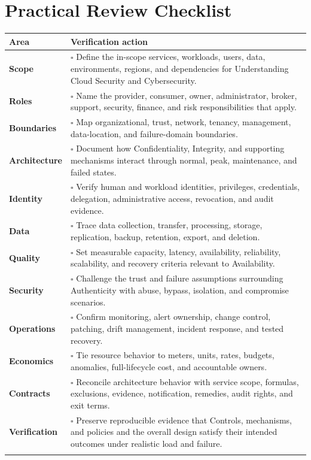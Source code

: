 \documentclass[11pt]{article}
\begin{document}
\section{Practical Review Checklist}
\begin{longtable}{@{}>{\bfseries\color{Teal}}p{}>{\RaggedRight\arraybackslash}p{}@{}}
\toprule\textbf{Area} & \textbf{Verification action}\\\midrule\endhead
Scope & $\square$ Define the in-scope services, workloads, users, data, environments, regions, and dependencies for Understanding Cloud Security and Cybersecurity. \\\addlinespace[2pt]
Roles & $\square$ Name the provider, consumer, owner, administrator, broker, support, security, finance, and risk responsibilities that apply. \\\addlinespace[2pt]
Boundaries & $\square$ Map organizational, trust, network, tenancy, management, data-location, and failure-domain boundaries. \\\addlinespace[2pt]
Architecture & $\square$ Document how Confidentiality, Integrity, and supporting mechanisms interact through normal, peak, maintenance, and failed states. \\\addlinespace[2pt]
Identity & $\square$ Verify human and workload identities, privileges, credentials, delegation, administrative access, revocation, and audit evidence. \\\addlinespace[2pt]
Data & $\square$ Trace data collection, transfer, processing, storage, replication, backup, retention, export, and deletion. \\\addlinespace[2pt]
Quality & $\square$ Set measurable capacity, latency, availability, reliability, scalability, and recovery criteria relevant to Availability. \\\addlinespace[2pt]
Security & $\square$ Challenge the trust and failure assumptions surrounding Authenticity with abuse, bypass, isolation, and compromise scenarios. \\\addlinespace[2pt]
Operations & $\square$ Confirm monitoring, alert ownership, change control, patching, drift management, incident response, and tested recovery. \\\addlinespace[2pt]
Economics & $\square$ Tie resource behavior to meters, units, rates, budgets, anomalies, full-lifecycle cost, and accountable owners. \\\addlinespace[2pt]
Contracts & $\square$ Reconcile architecture behavior with service scope, formulas, exclusions, evidence, notification, remedies, audit rights, and exit terms. \\\addlinespace[2pt]
Verification & $\square$ Preserve reproducible evidence that Controls, mechanisms, and policies and the overall design satisfy their intended outcomes under realistic load and failure. \\\addlinespace[2pt]
\bottomrule
\end{longtable}
\end{document}
